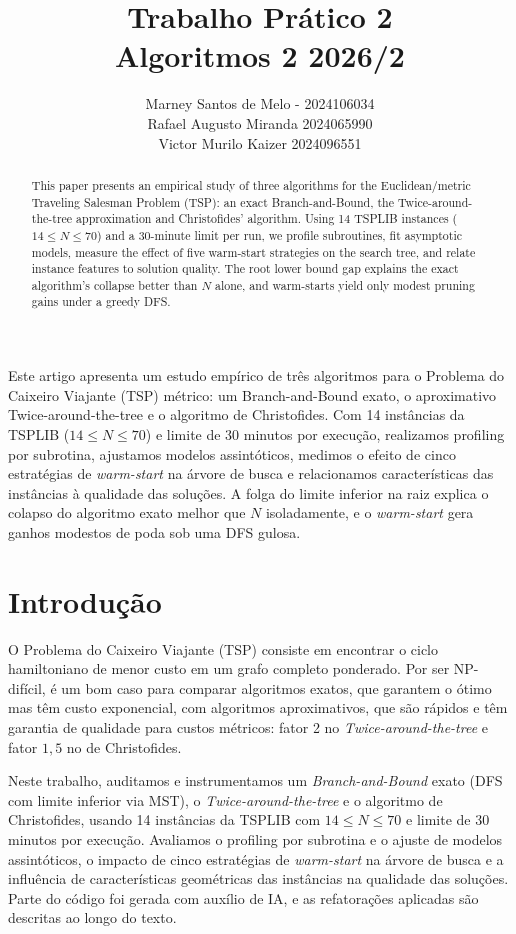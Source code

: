 \documentclass[12pt]{article}
\title{Trabalho Prático 2 \\ Algoritmos 2 2026/2}
\author{Marney Santos de Melo - 2024106034 \\ Rafael Augusto Miranda 2024065990 \\ Victor Murilo Kaizer 2024096551}
\begin{document}
 

\maketitle
     
\begin{abstract}
  This paper presents an empirical study of three algorithms for the
  Euclidean/metric Traveling Salesman Problem (TSP): an exact
  Branch-and-Bound, the Twice-around-the-tree approximation and
  Christofides' algorithm. Using 14 TSPLIB instances ($14 \le N \le 70$)
  and a 30-minute limit per run, we profile subroutines, fit asymptotic
  models, measure the effect of five warm-start strategies on the search
  tree, and relate instance features to solution quality. The root lower
  bound gap explains the exact algorithm's collapse better than $N$ alone,
  and warm-starts yield only modest pruning gains under a greedy DFS.
\end{abstract}

\begin{resumo}
  Este artigo apresenta um estudo empírico de três algoritmos para o
  Problema do Caixeiro Viajante (TSP) métrico: um Branch-and-Bound exato,
  o aproximativo Twice-around-the-tree e o algoritmo de Christofides.
  Com 14 instâncias da TSPLIB ($14 \le N \le 70$) e limite de 30 minutos
  por execução, realizamos profiling por subrotina, ajustamos modelos
  assintóticos, medimos o efeito de cinco estratégias de \textit{warm-start}
  na árvore de busca e relacionamos características das instâncias à
  qualidade das soluções. A folga do limite inferior na raiz explica o
  colapso do algoritmo exato melhor que $N$ isoladamente, e o
  \textit{warm-start} gera ganhos modestos de poda sob uma DFS gulosa.
\end{resumo}


\section{Introdução}

O Problema do Caixeiro Viajante (TSP) consiste em encontrar o ciclo hamiltoniano de menor custo em um grafo completo ponderado. Por ser NP-difícil, é um bom caso para comparar algoritmos exatos, que garantem o ótimo mas têm custo exponencial, com algoritmos aproximativos, que são rápidos e têm garantia de qualidade para custos métricos: fator 2 no \textit{Twice-around-the-tree} e fator $1{,}5$ no de Christofides.

Neste trabalho, auditamos e instrumentamos um \textit{Branch-and-Bound} exato (DFS com limite inferior via MST), o \textit{Twice-around-the-tree} e o algoritmo de Christofides, usando 14 instâncias da TSPLIB com $14 \le N \le 70$ e limite de 30 minutos por execução. Avaliamos o profiling por subrotina e o ajuste de modelos assintóticos, o impacto de cinco estratégias de \textit{warm-start} na árvore de busca e a influência de características geométricas das instâncias na qualidade das soluções. Parte do código foi gerada com auxílio de IA, e as refatorações aplicadas são descritas ao longo do texto.
\end{document}

